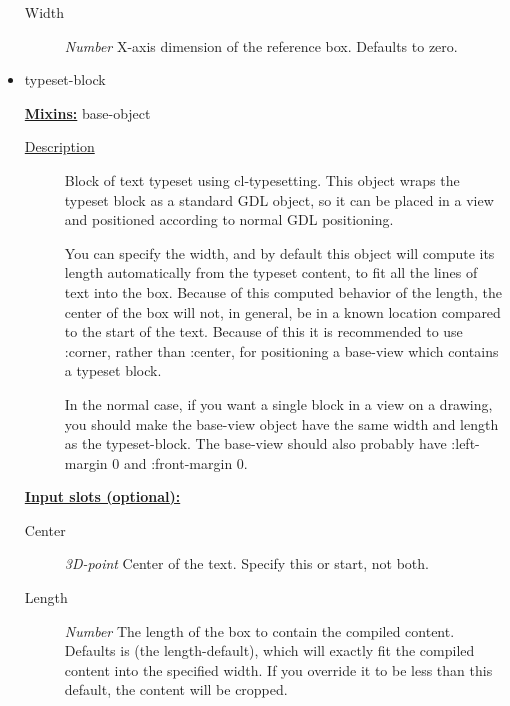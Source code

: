 \documentclass [11pt]{book}
\begin{document}
\begin{itemize}
\begin{description}
\item [Width]
\emph{Number} X-axis dimension of the reference box. Defaults to zero.


\end{description}







\item {}typeset-block


\textbf{
\underline{Mixins:}} base-object





\begin{description}

\item [
\underline{Description}]


Block of text typeset using cl-typesetting. This object
wraps the typeset block as a standard GDL object, so it can be placed in a view and 
positioned according to normal GDL positioning.

You can specify the width, and by default this object will compute its length automatically 
from the typeset content, to fit all the lines of text into the box. Because of this 
computed behavior of the length, the center of the box will not, in general, be in a 
known location compared to the start of the text. Because of this it is recommended
to use :corner, rather than :center, for positioning a base-view which contains
a typeset block. 

In the normal case, if you want a single block in a view on a drawing, you should
make the base-view object have the same width and length as the typeset-block. The
base-view should also probably have :left-margin 0 and :front-margin 0.



\end{description}








\textbf{
\underline{Input slots (optional):}}

\begin{description}

\item [Center]
\emph{3D-point} Center of the text. Specify this or start, not both.


\item [Length]
\emph{Number} The length of the box to contain the compiled content. Defaults is (the length-default),
which will exactly fit the compiled content into the specified width. If you override it to be less
than this default, the content will be cropped.



\end{description}
\end{itemize}
\end{document}
